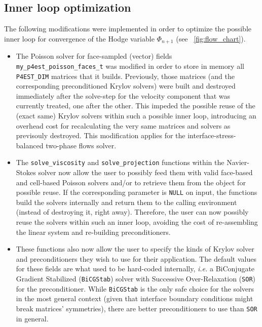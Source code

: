 \documentclass[11pt, a4paper]{article}
\newcommand{\fig}{\figurename \ }
\theoremstyle{remark}
\begin{document}
\subsection{Inner loop optimization}
\label{subsec:inner_loop_optimization}
The following modifications were implemented in order to optimize the possible inner loop for convergence of the Hodge variable $\Phi_{n+1}$ (see \fig \ref{fig:flow_chart}).
\begin{itemize}
 \item The Poisson solver for face-sampled (vector) fields \verb|my_p4est_poisson_faces_t| was modified in order to store in memory all \verb|P4EST_DIM| matrices that it builds. Previously, those matrices (and the corresponding preconditioned Krylov solvers) were built and destroyed immediately after the solve-step for the velocity component that was currently treated, one after the other. This impeded the possible reuse of the (exact same) Krylov solvers within such a possible inner loop, introducing an overhead cost for recalculating the very same matrices and solvers as previsouly destroyed. This modification applies for the interface-stress-balanced two-phase flows solver.
 \item The \verb|solve_viscosity| and \verb|solve_projection| functions within the Navier-Stokes solver now allow the user to possibly feed them with valid face-based and cell-based Poisson solvers and/or to retrieve them from the object for possible reuse. If the corresponding parameter is \verb|NULL| on input, the functions build the solvers internally and return them to the calling environment (instead of destroying it, right away). Therefore, the user can now possibly reuse the solvers within such an inner loop, avoiding the cost of re-assembling the linear system and re-building preconditioners.
 \item These functions also now allow the user to specify the kinds of Krylov solver and preconditioners they wish to use for their application. The default values for these fields are what used to be hard-coded internally, \textit{i.e.} a BiConjugate Gradient Stabilized (\verb|BiCGStab|) solver with Successive Over-Relaxation (\verb|SOR|) for the preconditioner. While \verb|BiCGStab| is the only safe choice for the solvers in the most general context (given that interface boundary conditions might break matrices' symmetries), there are better preconditioners to use than \verb|SOR| in general.

\end{itemize}
\end{document}
